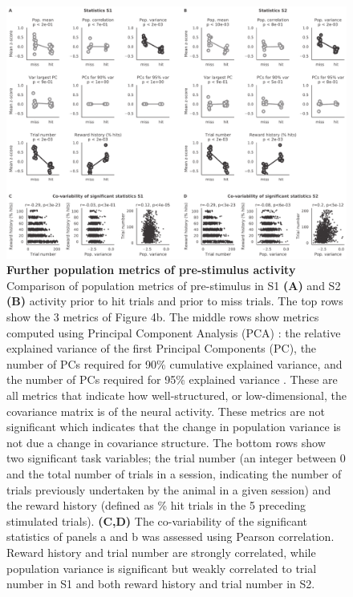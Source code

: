 \begin{figure}[h!]
\vspace*{-1.5cm}
\hspace*{-0.6in}
\includegraphics[scale=0.48]{figures/supplements/Supplementary_Figure6.pdf}
\caption[\textbf{Further population metrics of pre-stimulus activity
}]{\textbf{Further population metrics of pre-stimulus activity
} 
Comparison of population metrics of pre-stimulus in  S1 \textbf{(A)} and S2 \textbf{(B)} activity prior to hit trials and prior to miss trials. The top rows show the 3 metrics of Figure 4b. The middle rows show metrics computed using Principal Component Analysis (PCA) \cite{cunningham_dimensionality_2014}: the relative explained variance of the first Principal Components (PC), the number of PCs required for 90\% cumulative explained variance, and the number of PCs required for 95\% explained variance \cite{williamson_scaling_2016}. These are all metrics that indicate how well-structured, or low-dimensional, the covariance matrix is of the neural activity. These metrics are not significant which indicates that the change in population variance is not due a change in covariance structure. The bottom rows show two significant task variables; the trial number (an integer between 0 and the total number of trials in a session, indicating the number of trials previously undertaken by the animal in a given session) and the reward history (defined as \% hit trials in the 5 preceding stimulated trials). \textbf{(C,D)} The co-variability of the significant statistics of panels a and b was assessed using Pearson correlation. Reward history and trial number are strongly correlated, while population variance is significant but weakly correlated to trial number in S1 and both reward history and trial number in S2. 
} 
\label{fig:supp6}
\end{figure}


